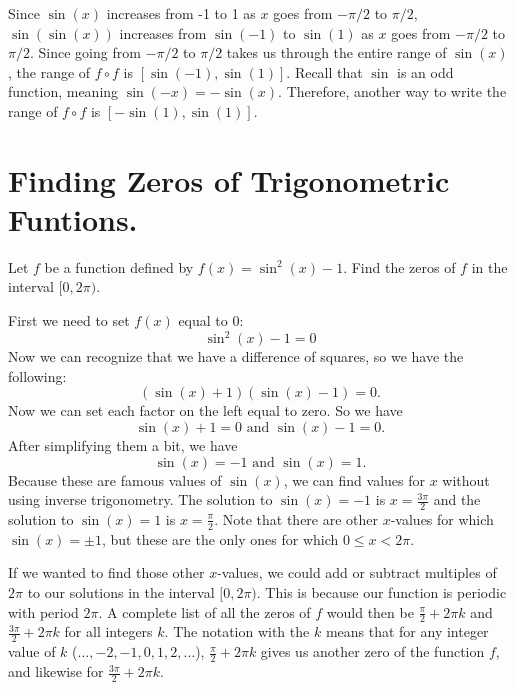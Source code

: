 \documentclass{ximera}
\begin{document}
\begin{example}
\begin{explanation}
\begin{enumerate}
Since $\sin(x)$ increases from -1 to 1 as $x$ goes from $-\pi/2$ to $\pi/2$, $\sin(\sin(x))$ increases from $\sin(-1)$ to $\sin(1)$ as $x$ goes from $-\pi/2$ to $\pi/2$. Since going from $-\pi/2$ to $\pi/2$ takes us through the entire range of $\sin(x)$, the range of $f \circ f$ is $[\sin(-1), \sin(1)]$. Recall that $\sin$ is an odd function, meaning $\sin(-x) = -\sin(x)$. Therefore, another way to write the range of $f \circ f$ is $[-\sin(1), \sin(1)]$. 
\end{enumerate}
\end{explanation}
\end{example}

\section{Finding Zeros of Trigonometric Funtions.}
\begin{example}
Let $f$ be a function defined by $f(x)=\sin^2(x)-1$. Find the zeros of $f$ in the interval $[0, 2\pi)$.

\begin{explanation}
First we need to set $f(x)$ equal to $0$:\\
\[
\sin^2(x)-1=0
\]
Now we can recognize that we have a difference of squares, so we have the following:
\[
(\sin(x)+1)(\sin(x)-1) = 0.
\]
Now we can set each factor on the left equal to zero. So we have
\[
\sin(x)+1=0 \text{ and } \sin(x)-1 =0.
\]
After simplifying them a bit, we have
\[
\sin(x) =-1 \text{ and } \sin(x)=1.
\]
Because these are famous values of $\sin(x)$, we can find values for $x$ without using inverse trigonometry. The solution to $\sin(x) = -1$ is $x = \frac{3\pi}{2}$ and the solution to $\sin(x) = 1$ is $x = \frac{\pi}{2}$. Note that there are other $x$-values for which $\sin(x) = \pm 1$, but these are the only ones for which $0 \le x < 2\pi$. 

If we wanted to find those other $x$-values, we could add or subtract multiples of $2\pi$ to our solutions in the interval $[0, 2\pi)$. This is because our function is periodic with period $2\pi$. A complete list of all the zeros of $f$ would then be $\frac{\pi}{2} + 2\pi k$ and $\frac{3\pi}{2} + 2\pi k$ for all integers $k$. The notation with the $k$ means that for any integer value of $k$ ($\ldots, -2, -1, 0, 1, 2, \ldots$), $\frac{\pi}{2} + 2\pi k$ gives us another zero of the function $f$, and likewise for $\frac{3\pi}{2} + 2\pi k$. 
\end{explanation}
\end{example}
\end{document}
